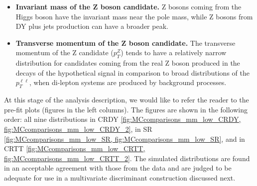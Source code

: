 \begin{small}
\begin{itemize}
\item{\bfseries Invariant mass of the Z boson candidate.} 
Z bosons coming from the Higgs boson have the invariant mass near the pole mass, while Z bosons from DY plus jets production can have a broader peak.

\item{\bfseries Transverse momentum of the Z boson candidate.} 
The transverse momentum of the Z candidate ($p_T^Z$) tends to have a relatively narrow distribution for candidates coming from the real Z boson produced in the decays of the hypothetical signal in comparison to broad distributions of the $p_T^{\ell\ell}$, when di-lepton systems are produced by background processes. 

\end{itemize}
           
At this stage of the analysis description, we would like to refer the reader to the pre-fit plots (figures in the left columns). The figures are shown in the following order: all nine distributions in CRDY \ref{fig:MCcomparisons_mm_low_CRDY, fig:MCcomparisons_mm_low_CRDY_2}, in SR \ref{fig:MCcomparisons_mm_low_SR, fig:MCcomparisons_mm_low_SR}, and in CRTT \ref{fig:MCcomparisons_mm_low_CRTT, fig:MCcomparisons_mm_low_CRTT_2}. The simulated distributions are found in an acceptable agreement with those from the data and are judged to be adequate for use in a multivariate discriminant construction discussed next. 


\end{small}

